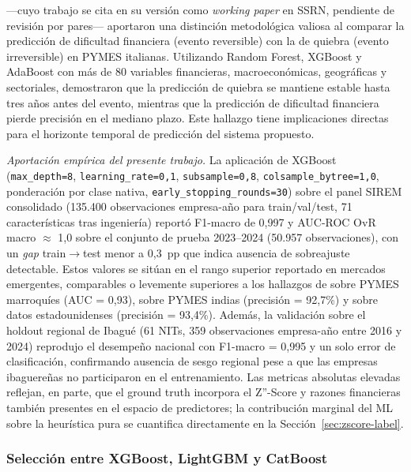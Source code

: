 \documentclass[12pt, letterpaper]{article}
\begin{document}
\citet{Bortolotti2024} ---cuyo trabajo se cita en su versi\'on como \textit{working paper} en SSRN, pendiente de revisi\'on por pares--- aportaron una distinci\'on metodol\'ogica valiosa al comparar la predicci\'on de dificultad financiera (evento reversible) con la de quiebra (evento irreversible) en PYMES italianas. Utilizando Random Forest, XGBoost y AdaBoost con m\'as de 80 variables financieras, macroecon\'omicas, geogr\'aficas y sectoriales, demostraron que la predicci\'on de quiebra se mantiene estable hasta tres a\~nos antes del evento, mientras que la predicci\'on de dificultad financiera pierde precisi\'on en el mediano plazo. Este hallazgo tiene implicaciones directas para el horizonte temporal de predicci\'on del sistema propuesto.

\textit{Aportaci\'on emp\'irica del presente trabajo.} La aplicaci\'on de XGBoost (\texttt{max\_depth=8}, \texttt{learning\_rate=0,1}, \texttt{subsample=0,8}, \texttt{colsample\_bytree=1,0}, ponderaci\'on por clase nativa, \texttt{early\_stopping\_rounds=30}) sobre el panel SIREM consolidado (135.400 observaciones empresa-a\~no para train/val/test, 71 caracter\'isticas tras ingenier\'ia) report\'o F1-macro de 0,997 y AUC-ROC OvR macro $\approx$ 1,0 sobre el conjunto de prueba 2023--2024 (50.957 observaciones), con un \textit{gap} train$\rightarrow$test menor a 0,3~pp que indica ausencia de sobreajuste detectable. Estos valores se sit\'uan en el rango superior reportado en mercados emergentes, comparables o levemente superiores a los hallazgos de \citet{Boumhidi2025} sobre PYMES marroqu\'ies (AUC = 0,93), \citet{Mahesh2025} sobre PYMES indias (precisi\'on = 92,7\%) y \citet{Yufenyuy2024} sobre datos estadounidenses (precisi\'on = 93,4\%). Adem\'as, la validaci\'on sobre el holdout regional de Ibagu\'e (61 NITs, 359 observaciones empresa-a\~no entre 2016 y 2024) reprodujo el desempe\~no nacional con F1-macro = 0,995 y un solo error de clasificaci\'on, confirmando ausencia de sesgo regional pese a que las empresas ibaguere\~nas no participaron en el entrenamiento. Las metricas absolutas elevadas reflejan, en parte, que el ground truth incorpora el Z''-Score y razones financieras tambi\'en presentes en el espacio de predictores; la contribuci\'on marginal del ML sobre la heur\'istica pura se cuantifica directamente en la Secci\'on~\ref{sec:zscore-label}.

\subsubsection{Selecci\'on entre XGBoost, LightGBM y CatBoost}
\label{sec:gbdt-comparison}
\end{document}

